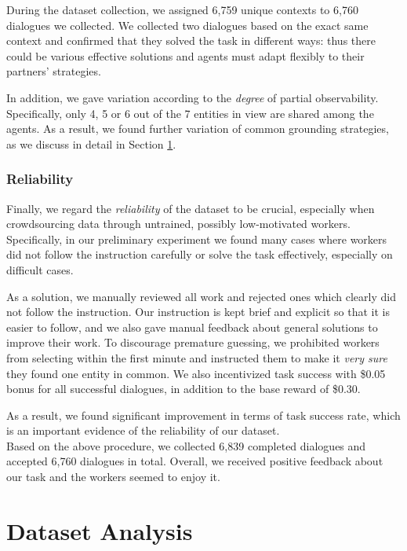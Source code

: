 \documentclass[letterpaper]{article} %
\begin{document}
During the dataset collection, we assigned 6,759 unique contexts to 6,760 dialogues we collected. We collected two dialogues based on the exact same context and confirmed that they solved the task in different ways: thus there could be various effective solutions and agents must adapt flexibly to their partners' strategies.

In addition, we gave variation according to the \textit{degree} of partial observability. Specifically, only 4, 5 or 6 out of the 7 entities in view are shared among the agents. As a result, we found further variation of common grounding strategies, as we discuss in detail in Section \ref{section:dataset_analysis}.

\subsubsection{Reliability}

Finally, we regard the \emph{reliability} of the dataset to be crucial, especially when crowdsourcing data through untrained, possibly low-motivated workers. Specifically, in our preliminary experiment we found many cases where workers did not follow the instruction carefully or solve the task effectively, especially on difficult cases.

As a solution, we manually reviewed all work and rejected ones which clearly did not follow the instruction. Our instruction is kept brief and explicit so that it is easier to follow, and we also gave manual feedback about general solutions to improve their work. To discourage premature guessing, we prohibited workers from selecting within the first minute and instructed them to make it \emph{very sure} they found one entity in common. We also incentivized task success with \$0.05 bonus for all successful dialogues, in addition to the base reward of \$0.30.

As a result, we found significant improvement in terms of task success rate, which is an important evidence of the reliability of our dataset. \\

Based on the above procedure, we collected 6,839 completed dialogues and accepted 6,760 dialogues in total. Overall, we received positive feedback about our task and the workers seemed to enjoy it.

\section{Dataset Analysis}
\label{section:dataset_analysis}
\end{document}
